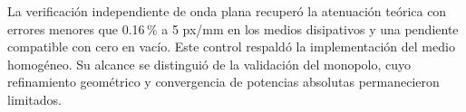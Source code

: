 La verificación independiente de onda plana recuperó la atenuación teórica con errores menores que 0.16\,\% a 5 px/mm en los medios disipativos y una pendiente compatible con cero en vacío. Este control respaldó la implementación del medio homogéneo. Su alcance se distinguió de la validación del monopolo, cuyo refinamiento geométrico y convergencia de potencias absolutas permanecieron limitados.
